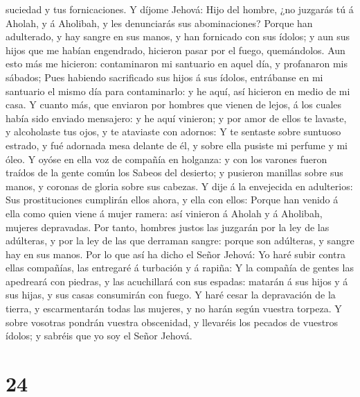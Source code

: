 suciedad y tus fornicaciones.  Y díjome Jehová: Hijo del
hombre, ¿no juzgarás tú á Aholah, y á Aholibah, y les denunciarás sus
abominaciones?  Porque han adulterado, y hay sangre en
sus manos, y han fornicado con sus ídolos; y aun sus hijos que me habían
engendrado, hicieron pasar por el fuego, quemándolos. 
Aun esto más me hicieron: contaminaron mi santuario en aquel día, y
profanaron mis sábados;  Pues habiendo sacrificado sus
hijos á sus ídolos, entrábanse en mi santuario el mismo día para
contaminarlo: y he aquí, así hicieron en medio de mi casa.
 Y cuanto más, que enviaron por hombres que vienen de
lejos, á los cuales había sido enviado mensajero: y he aquí vinieron; y
por amor de ellos te lavaste, y alcoholaste tus ojos, y te ataviaste con
adornos:  Y te sentaste sobre suntuoso estrado, y fué
adornada mesa delante de él, y sobre ella pusiste mi perfume y mi óleo.
 Y oyóse en ella voz de compañía en holganza: y con los
varones fueron traídos de la gente común los Sabeos del desierto; y
pusieron manillas sobre sus manos, y coronas de gloria sobre sus
cabezas.  Y dije á la envejecida en adulterios: Sus
prostituciones cumplirán ellos ahora, y ella con ellos: 
Porque han venido á ella como quien viene á mujer ramera: así vinieron á
Aholah y á Aholibah, mujeres depravadas.  Por tanto,
hombres justos las juzgarán por la ley de las adúlteras, y por la ley de
las que derraman sangre: porque son adúlteras, y sangre hay en sus
manos.  Por lo que así ha dicho el Señor Jehová: Yo haré
subir contra ellas compañías, las entregaré á turbación y á rapiña:
 Y la compañía de gentes las apedreará con piedras, y las
acuchillará con sus espadas: matarán á sus hijos y á sus hijas, y sus
casas consumirán con fuego.  Y haré cesar la depravación
de la tierra, y escarmentarán todas las mujeres, y no harán según
vuestra torpeza.  Y sobre vosotras pondrán vuestra
obscenidad, y llevaréis los pecados de vuestros ídolos; y sabréis que yo
soy el Señor Jehová.

\hypertarget{section-23}{%
\section{24}\label{section-23}}

